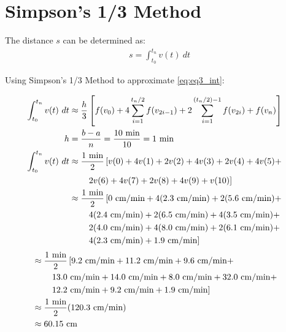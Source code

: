 \section{Simpson's 1/3 Method}
	The distance $s$ can be determined as:
	\begin{align}
		s = \int_{t_{0}}^{t_{n}} v(t) \ dt \label{eq:eq3_int}
	\end{align}

	Using Simpson's 1/3 Method to approximate \cref{eq:eq3_int}:

	\begin{align}
		\int_{t_{0}}^{t_{n}} v(t) \ dt &\approx  \frac{h}{3}\left[
		f(v_{0})+
		4 \sum_{i=1}^{t_{n}/2} f(v_{2i-1}) +
		2 \sum_{i=1}^{(t_{n}/2)-1} f(v_{2i}) +
		f(v_{n})
		\right]& \\
		h &= \frac{b-a}{n} = \frac{10 \ \text{min}}{10} = 1\ \text{min}& \\
		\int_{t_{0}}^{t_{n}} v(t) \ dt &\approx \frac{1\ \text{min}}{2} \left[
			v(0)+
			4v(1)+
			2v(2)+
			4v(3)+
			2v(4)+
			4v(5)+
			\right.& \notag \\ & \left. \quad \quad
			2v(6)+
			4v(7)+
			2v(8)+
			4v(9)+
			v(10)
		\right] & \\
		&\approx \frac{1\ \text{min}}{2} \left[
			0 \ \text{cm/min} +
			4(2.3 \ \text{cm/min} )+
			2(5.6 \ \text{cm/min} )+
			\right.& \notag \\ & \left. \quad \quad
			4(2.4 \ \text{cm/min} )+
			2(6.5 \ \text{cm/min} )+
			4(3.5 \ \text{cm/min} )+
			\right.& \notag \\ & \left. \quad \quad
			2(4.0 \ \text{cm/min} )+
			4(8.0 \ \text{cm/min} )+
			2(6.1 \ \text{cm/min} )+
			\right.& \notag \\ & \left. \quad \quad
			4(2.3 \ \text{cm/min} )+
			1.9 \ \text{cm/min}
		\right] & \notag
	\end{align}
	\begin{align}
		&\approx \frac{1\ \text{min}}{2} \left[
			9.2 \ \text{cm/min} +
			11.2 \ \text{cm/min} +
			9.6 \ \text{cm/min} +
			\right.& \notag \\ & \left. \quad \quad
			13.0 \ \text{cm/min} +
			14.0 \ \text{cm/min} +
			8.0 \ \text{cm/min} +
			32.0 \ \text{cm/min} +
			\right.& \notag \\ & \left. \quad \quad
			12.2 \ \text{cm/min} +
			9.2 \ \text{cm/min} +
			1.9 \ \text{cm/min}
		\right] & \notag \\
		&\approx \frac{1 \ \text{min}}{2}(120.3 \ \text{cm/min}) \notag \\
		&\approx 60.15 \ \text{cm}
	\end{align}
